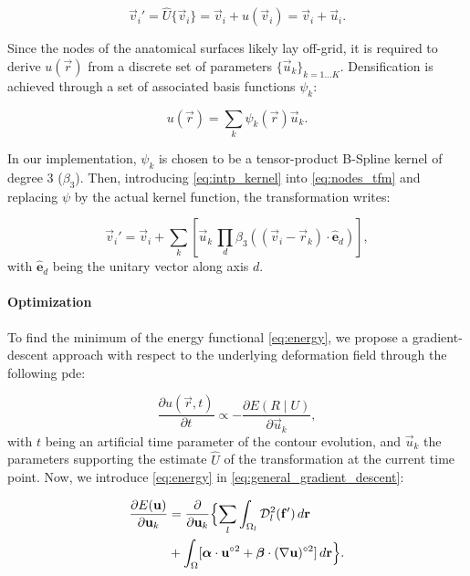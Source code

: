   \begin{equation}
  \vec{v}_i' = \hat{U}\{\vec{v}_i\} = \vec{v}_i + u(\vec{v}_i) = \vec{v}_i + \vec{u}_i.
  \label{eq:nodes_tfm}
  \end{equation}

Since the nodes of the anatomical surfaces likely lay off-grid, it is required to
  derive $u(\vec{r})$ from a discrete set of parameters $\{\vec{u}_k\}_{k=1 \ldots K}$.
Densification is achieved through a set of associated basis functions $\psi_k$:

  \begin{equation}
  u(\vec{r}) = \sum_k \psi_k(\vec{r}) \vec{u}_k.
  \label{eq:intp_kernel}
  \end{equation}

In our implementation, $\psi_k$ is chosen to be a tensor-product B-Spline kernel
  of degree 3 ($\beta_3$).
Then, introducing \eqref{eq:intp_kernel} into \eqref{eq:nodes_tfm} and replacing
  $\psi$ by the actual kernel function, the transformation writes:

  \begin{equation}
    \vec{v}_i' = \vec{v}_i + \sum_k \left[ \vec{u}_k \, \underset{d}{\prod}
      \beta_3( (\vec{v}_i - \vec{r}_k) \cdot \hat{\mathbf{e}}_d ) \right],
  \label{eq:transformation}
  \end{equation}
%
  with $\hat{\mathbf{e}}_d$ being the unitary vector along axis $d$.


\paragraph*{Optimization}
\label{sec:gradient_descent}
To find the minimum of the energy functional \eqref{eq:energy},
  we propose a gradient-descent approach with respect to the underlying
  deformation field through the following \gls*{pde}:

  \begin{equation}
  \frac{\partial u(\vec{r},t)}{\partial t} \propto - \frac{\partial E(R \mid U)}{\partial \vec{u}_k},
  \label{eq:general_gradient_descent}
  \end{equation}
%
  with $t$ being an artificial time parameter of the contour
  evolution, and $\vec{u}_k$ the parameters supporting the estimate
  $\hat{U}$ of the transformation at the current time point.
Now, we introduce \eqref{eq:energy} in \eqref{eq:general_gradient_descent}:

  \begin{align}
  \frac{\partial E(\vec{u})}{\partial \vec{u}_k} &=
  \frac{ \partial }{\partial \vec{u}_k} \Big\{
  \underset{l}{\sum} \int_{\Omega_l} \mdist{f'}{l} \,d\vec{r} \notag\\
  &+ \int_{\Omega} [ \boldsymbol{\alpha} \cdot \vec{u}^{\circ2}
  + \boldsymbol{\beta} \cdot (\nabla \vec{u})^{\circ2} ] \,d\vec{r}
  \Big\}.
  \label{eq:gradient_descent}
  \end{align}


